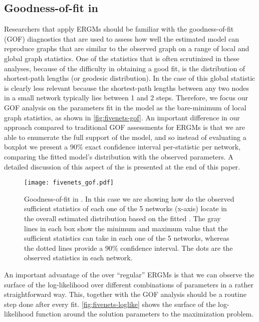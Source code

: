 \documentclass[12pt]{article}
\begin{document}


\subsection{Goodness-of-fit in \ergmitos}

Researchers that apply ERGMs should be familiar with the goodness-of-fit (GOF) diagnostics that are used to assess how well the estimated model can reproduce graphs that are similar to the observed graph on a range of local and global graph statistics. One of the statistics that is often scrutinized in these analyses, because of the difficulty in obtaining a good fit, is the distribution of shortest-path lengths (or geodesic distribution). In the case of \ergmitos{} this global statistic is clearly less relevant because the shortest-path lengths between any two nodes in a small network typically lies between 1 and 2 steps. Therefore, we focus our GOF analysis on the parameters fit in the model as the bare-minimum of local graph statistics, as shown in \autoref{fig:fivenets-gof}. An important difference in our approach compared to traditional GOF assessments for ERGMs is that we are able to enumerate the full support of the model, and so instead of evaluating a boxplot we present a 90\% exact confidence interval per-statistic per network, comparing the fitted model's distribution with the observed parameters. A detailed discussion of this aspect of the \ergmitos{} is presented at the end of this paper.

\begin{figure}[tb]
    \centering
    \caption{Goodness-of-fit in \ergmitos{}. In this case we are showing how do the observed sufficient statistics of each one of the 5 networks (x-axis) locate in the overall estimated distribution based on the fitted \ergmito{}. The gray lines in each box show the minimum and maximum value that the sufficient statistics can take in each one of the 5 networks, whereas the dotted lines provide a 90\% confidence interval. The dots are the observed statistics in each network.}
    \texttt{[image: fivenets\_gof.pdf]}
    \label{fig:fivenets-gof}
\end{figure}

An important advantage of the \ergmitos{} over ``regular'' ERGMs is that we can observe the surface of the log-likelihood over different combinations of parameters in a rather straightforward way. This, together with the GOF analysis should be a routine step done after every \ergmito{} fit. \autoref{fig:fivenets-loglike} shows the surface of the log-likelihood function around the solution parameters to the maximization problem.
\end{document}
